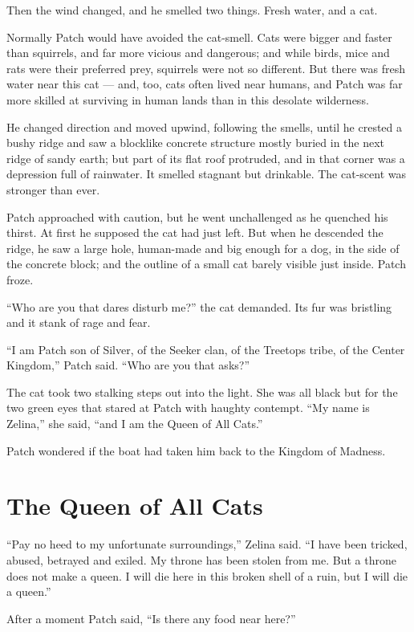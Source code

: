 \documentclass[12pt]{memoir}
\begin{document}
Then the wind changed, and he smelled two things. Fresh water, and a
cat.

Normally Patch would have avoided the cat-smell. Cats were bigger and
faster than squirrels, and far more vicious and dangerous; and while
birds, mice and rats were their preferred prey, squirrels were not so
different. But there was fresh water near this cat — and, too, cats
often lived near humans, and Patch was far more skilled at surviving
in human lands than in this desolate wilderness.

He changed direction and moved upwind, following the smells, until he
crested a bushy ridge and saw a blocklike concrete structure mostly
buried in the next ridge of sandy earth; but part of its flat roof
protruded, and in that corner was a depression full of rainwater. It
smelled stagnant but drinkable. The cat-scent was stronger than ever.

Patch approached with caution, but he went unchallenged as he quenched
his thirst. At first he supposed the cat had just left. But when he
descended the ridge, he saw a large hole, human-made and big enough
for a dog, in the side of the concrete block; and the outline of a
small cat barely visible just inside. Patch froze.

“Who are you that dares disturb me?” the cat demanded. Its fur was
bristling and it stank of rage and fear.

“I am Patch son of Silver, of the Seeker clan, of the Treetops tribe,
of the Center Kingdom,” Patch said. “Who are you that asks?”

The cat took two stalking steps out into the light. She was all black
but for the two green eyes that stared at Patch with haughty
contempt. “My name is Zelina,” she said, “and I am the Queen of All
Cats.”

Patch wondered if the boat had taken him back to the Kingdom of
Madness.


\section{The Queen of All Cats}

“Pay no heed to my unfortunate surroundings,” Zelina said. “I have
been tricked, abused, betrayed and exiled. My throne has been stolen
from me. But a throne does not make a queen. I will die here in this
broken shell of a ruin, but I will die a queen.”

After a moment Patch said, “Is there any food near here?”
\end{document}
